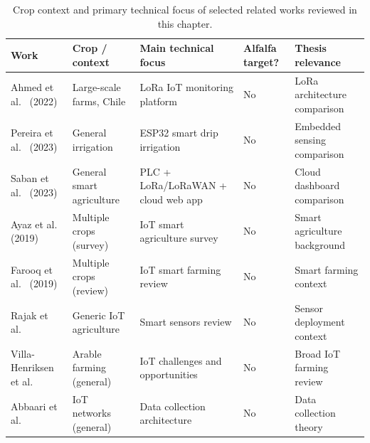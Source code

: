 \begin{table}[H]
  \centering
  \caption{Crop context and primary technical focus of selected related works
           reviewed in this chapter.}
  \label{tab:related-work-crop-focus}
  \renewcommand{\arraystretch}{1.3}
  \begin{tabular}{|p{3.8cm}|p{2.4cm}|p{3.6cm}|p{1.4cm}|p{2.0cm}|}
    \hline
    \textbf{Work} & \textbf{Crop / context} & \textbf{Main technical focus} &
    \textbf{Alfalfa target?} & \textbf{Thesis relevance} \\
    \hline
    Ahmed et al.~\cite{ahmed2022lora_agriculture_chile} (2022) &
    Large-scale farms, Chile &
    LoRa IoT monitoring platform &
    No & LoRa architecture comparison \\
    \hline
    Pereira et al.~\cite{pereira2023esp32_drip_irrigation} (2023) &
    General irrigation &
    ESP32 smart drip irrigation &
    No & Embedded sensing comparison \\
    \hline
    Saban et al.~\cite{saban2023smart_agricultural_lora_cloud} (2023) &
    General smart agriculture &
    PLC + LoRa/LoRaWAN + cloud web app &
    No & Cloud dashboard comparison \\
    \hline
    Ayaz et al.~\cite{ayaz2019iot_smart_agriculture_survey} (2019) &
    Multiple crops (survey) &
    IoT smart agriculture survey &
    No & Smart agriculture background \\
    \hline
    Farooq et al.~\cite{farooq2019iot_smart_agriculture_review} (2019) &
    Multiple crops (review) &
    IoT smart farming review &
    No & Smart farming context \\
    \hline
    Rajak et al.~\cite{rajak2023iot_smart_sensors_agriculture} &
    Generic IoT agriculture &
    Smart sensors review &
    No & Sensor deployment context \\
    \hline
    Villa-Henriksen et al.~\cite{villa2020iot_arable_farming} &
    Arable farming (general) &
    IoT challenges and opportunities &
    No & Broad IoT farming review \\
    \hline
    Abbaari et al.~\cite{abbaari2024data_collection_iot_networks} &
    IoT networks (general) &
    Data collection architecture &
    No & Data collection theory \\

\end{tabular}
\end{table}
